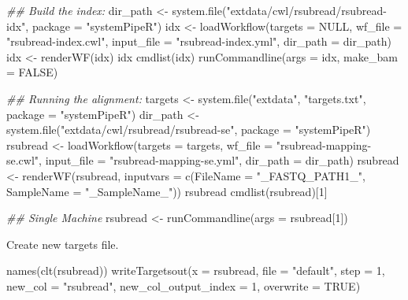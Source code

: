 \documentclass[14pt,]{article}
\newcommand{\hlnum}[1]{\textcolor[rgb]{0.816,0.125,0.439}{#1}}%
\newcommand{\hlstr}[1]{\textcolor[rgb]{0.251,0.627,0.251}{#1}}%
\newcommand{\hlcom}[1]{\textcolor[rgb]{0.502,0.502,0.502}{\textit{#1}}}%
\newcommand{\hlstd}[1]{\textcolor[rgb]{0.251,0.251,0.251}{#1}}%
\newcommand{\hlkwc}[1]{\textcolor[rgb]{0.251,0.251,0.251}{#1}}%
\newcommand{\hlkwd}[1]{\textcolor[rgb]{0.878,0.439,0.125}{#1}}%
\newenvironment{Shaded}{\begin{myshaded}}{\end{myshaded}}
\newcommand{\KeywordTok}[1]{\hlkwd{#1}}
\newcommand{\DataTypeTok}[1]{\hlkwc{#1}}
\newcommand{\DecValTok}[1]{\hlnum{#1}}
\newcommand{\StringTok}[1]{\hlstr{#1}}
\newcommand{\CommentTok}[1]{\hlcom{#1}}
\newcommand{\OtherTok}[1]{{#1}}
\newcommand{\NormalTok}[1]{\hlstd{#1}}
\begin{document}
\begin{Shaded}
\begin{Highlighting}[]
\CommentTok{## Build the index:}
\NormalTok{dir_path <-}\StringTok{ }\KeywordTok{system.file}\NormalTok{(}\StringTok{"extdata/cwl/rsubread/rsubread-idx"}\NormalTok{, }\DataTypeTok{package =} \StringTok{"systemPipeR"}\NormalTok{)}
\NormalTok{idx <-}\StringTok{ }\KeywordTok{loadWorkflow}\NormalTok{(}\DataTypeTok{targets =} \OtherTok{NULL}\NormalTok{, }\DataTypeTok{wf_file =} \StringTok{"rsubread-index.cwl"}\NormalTok{, }\DataTypeTok{input_file =} \StringTok{"rsubread-index.yml"}\NormalTok{, }
    \DataTypeTok{dir_path =}\NormalTok{ dir_path)}
\NormalTok{idx <-}\StringTok{ }\KeywordTok{renderWF}\NormalTok{(idx)}
\NormalTok{idx}
\KeywordTok{cmdlist}\NormalTok{(idx)}
\KeywordTok{runCommandline}\NormalTok{(}\DataTypeTok{args =}\NormalTok{ idx, }\DataTypeTok{make_bam =} \OtherTok{FALSE}\NormalTok{)}

\CommentTok{## Running the alignment:}
\NormalTok{targets <-}\StringTok{ }\KeywordTok{system.file}\NormalTok{(}\StringTok{"extdata"}\NormalTok{, }\StringTok{"targets.txt"}\NormalTok{, }\DataTypeTok{package =} \StringTok{"systemPipeR"}\NormalTok{)}
\NormalTok{dir_path <-}\StringTok{ }\KeywordTok{system.file}\NormalTok{(}\StringTok{"extdata/cwl/rsubread/rsubread-se"}\NormalTok{, }\DataTypeTok{package =} \StringTok{"systemPipeR"}\NormalTok{)}
\NormalTok{rsubread <-}\StringTok{ }\KeywordTok{loadWorkflow}\NormalTok{(}\DataTypeTok{targets =}\NormalTok{ targets, }\DataTypeTok{wf_file =} \StringTok{"rsubread-mapping-se.cwl"}\NormalTok{, }
    \DataTypeTok{input_file =} \StringTok{"rsubread-mapping-se.yml"}\NormalTok{, }\DataTypeTok{dir_path =}\NormalTok{ dir_path)}
\NormalTok{rsubread <-}\StringTok{ }\KeywordTok{renderWF}\NormalTok{(rsubread, }\DataTypeTok{inputvars =} \KeywordTok{c}\NormalTok{(}\DataTypeTok{FileName =} \StringTok{"_FASTQ_PATH1_"}\NormalTok{, }\DataTypeTok{SampleName =} \StringTok{"_SampleName_"}\NormalTok{))}
\NormalTok{rsubread}
\KeywordTok{cmdlist}\NormalTok{(rsubread)[}\DecValTok{1}\NormalTok{]}

\CommentTok{## Single Machine}
\NormalTok{rsubread <-}\StringTok{ }\KeywordTok{runCommandline}\NormalTok{(}\DataTypeTok{args =}\NormalTok{ rsubread[}\DecValTok{1}\NormalTok{])}
\end{Highlighting}
\end{Shaded}

Create new targets file.

\begin{Shaded}
\begin{Highlighting}[]
\KeywordTok{names}\NormalTok{(}\KeywordTok{clt}\NormalTok{(rsubread))}
\KeywordTok{writeTargetsout}\NormalTok{(}\DataTypeTok{x =}\NormalTok{ rsubread, }\DataTypeTok{file =} \StringTok{"default"}\NormalTok{, }\DataTypeTok{step =} \DecValTok{1}\NormalTok{, }\DataTypeTok{new_col =} \StringTok{"rsubread"}\NormalTok{, }\DataTypeTok{new_col_output_index =} \DecValTok{1}\NormalTok{, }
    \DataTypeTok{overwrite =} \OtherTok{TRUE}\NormalTok{)}
\end{Highlighting}
\end{Shaded}
\end{document}
